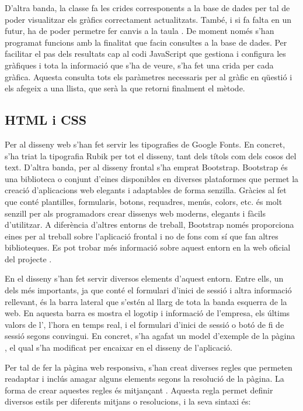 \documentclass{tfgitic}[2022/06/30]
\begin{document}
D'altra banda, la classe  fa les crides corresponents a la base de dades per tal de poder visualitzar els gràfics correctament actualitzats. També, i si fa falta en un futur, ha de poder permetre fer canvis a la taula . De moment només s'han programat funcions amb la finalitat que facin consultes a la base de dades. Per facilitar el pas dels resultats cap al codi JavaScript que gestiona i configura les gràfiques i tota la informació que s'ha de veure, s'ha fet una crida per cada gràfica. Aquesta consulta tots els paràmetres necessaris per al gràfic en qüestió i els afegeix a una llista, que serà la que retorni finalment el mètode.

\subsection{HTML i CSS}
Per al disseny web s'han fet servir les tipografies de Google Fonts. En concret, s'ha triat la tipografia Rubik per tot el disseny, tant dels títols com dels cosos del text. D'altra banda, per al disseny frontal s'ha emprat Bootstrap. Bootstrap és una biblioteca o conjunt d'eines disponibles en diverses plataformes que permet la creació d'aplicacions web elegants i adaptables de forma senzilla. Gràcies al fet que conté plantilles, formularis, botons, requadres, menús, colors, etc. és molt senzill per als programadors crear dissenys web moderns, elegants i fàcils d'utilitzar. A diferència d'altres entorns de treball, Bootstrap només proporciona eines per al treball sobre l'aplicació frontal i no de fons com sí que fan altres biblioteques. Es pot trobar més informació sobre aquest entorn en la web oficial del projecte \cite{Bootstrap}.

En el disseny s'han fet servir diversos elements d'aquest entorn. Entre ells, un dels més importants, ja que conté el formulari d'inici de sessió i altra informació rellevant, és la barra lateral que s'estén al llarg de tota la banda esquerra de la web. En aquesta barra es mostra el logotip i informació de l'empresa, els últims valors de l', l'hora en temps real, i el formulari d'inici de sessió o botó de fi de sessió segons convingui. En concret, s'ha agafat un model d'exemple de la pàgina \cite{bootstrap:barralateral}, el qual s'ha modificat per encaixar en el disseny de l'aplicació.

Per tal de fer la pàgina web responsiva, s'han creat diverses regles  que permeten readaptar i inclús amagar alguns elements segons la resolució de la pàgina. La forma de crear aquestes regles és mitjançant . Aquesta regla permet definir diversos estils  per diferents mitjans o resolucions, i la seva sintaxi és:
\end{document}
